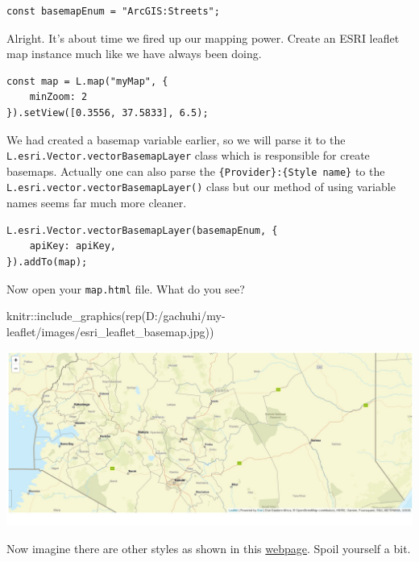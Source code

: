 \documentclass[
]{book}
\newenvironment{Shaded}{\begin{snugshade}}{\end{snugshade}}
\newcommand{\FunctionTok}[1]{\textcolor[rgb]{0.00,0.00,0.00}{#1}}
\newcommand{\NormalTok}[1]{#1}
\newcommand{\SpecialCharTok}[1]{\textcolor[rgb]{0.00,0.00,0.00}{#1}}
\newcommand{\StringTok}[1]{\textcolor[rgb]{0.31,0.60,0.02}{#1}}
\begin{document}
\begin{verbatim}
const basemapEnum = "ArcGIS:Streets";
\end{verbatim}

Alright. It's about time we fired up our mapping power. Create an ESRI leaflet map instance much like we have always been doing.

\begin{verbatim}
const map = L.map("myMap", {
    minZoom: 2
}).setView([0.3556, 37.5833], 6.5);
\end{verbatim}

We had created a basemap variable earlier, so we will parse it to the \texttt{L.esri.Vector.vectorBasemapLayer} class which is responsible for create basemaps. Actually one can also parse the \texttt{\{Provider\}:\{Style\ name\}} to the \texttt{L.esri.vector.vectorBasemapLayer()} class but our method of using variable names seems far much more cleaner.

\begin{verbatim}
L.esri.Vector.vectorBasemapLayer(basemapEnum, {
    apiKey: apiKey,
}).addTo(map);
\end{verbatim}

Now open your \texttt{map.html} file. What do you see?

\begin{Shaded}
\begin{Highlighting}[]
\NormalTok{knitr}\SpecialCharTok{::}\FunctionTok{include\_graphics}\NormalTok{(}\FunctionTok{rep}\NormalTok{(}\StringTok{\textquotesingle{}D:/gachuhi/my{-}leaflet/images/esri\_leaflet\_basemap.jpg\textquotesingle{}}\NormalTok{))}
\end{Highlighting}
\end{Shaded}

\includegraphics[width=26.57in]{../images/esri_leaflet_basemap}

Now imagine there are other styles as shown in this \href{https://developers.arcgis.com/documentation/mapping-apis-and-services/maps/services/basemap-layer-service/\#default-basemap-styles}{webpage}. Spoil yourself a bit.
\end{document}
